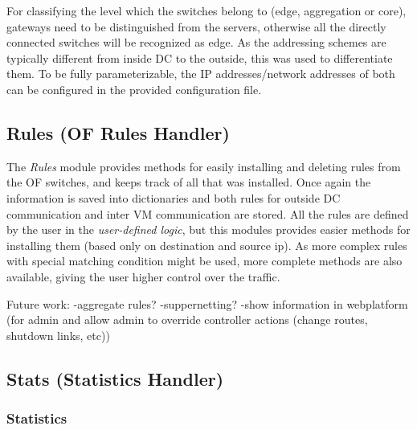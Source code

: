 \documentclass[12pt,english,oneside]{book}
\begin{document}
For classifying the level which the switches belong to (edge, aggregation or core), gateways need to be distinguished from the servers, otherwise all the directly connected switches will be recognized as edge. As the addressing schemes are typically different from inside DC to the outside, this was used to differentiate them. To be fully parameterizable, the IP addresses/network addresses of both can be configured in the provided configuration file.

\subsection{Rules (OF Rules Handler)}
\hspace{0.6cm}

The \textit{Rules} module provides methods for easily installing and deleting rules from the OF switches, and keeps track of all that was installed.
Once again the information is saved into dictionaries and both rules for outside DC communication and inter VM communication are stored.
All the rules are defined by the user in the \textit{user-defined logic}, but this modules provides easier methods for installing them (based only on destination and source ip). As more complex rules with special matching condition might be used, more complete methods are also available, giving the user higher control over the traffic.

Future work:
-aggregate rules?
-suppernetting?
-show information in webplatform (for admin and allow admin to override controller actions (change routes, shutdown links, etc))

\subsection{Stats (Statistics Handler)}

\subsubsection{Statistics}
\hspace{0.6cm}
\end{document}

